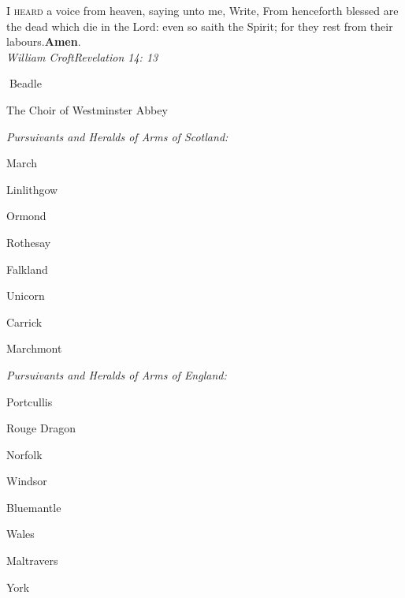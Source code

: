 \color{black}\normalfont \lettrine[lines=2,loversize=.2]{I}{ 
heard} a voice from heaven, saying unto me, Write, From henceforth blessed are
the dead which die in the Lord: even so saith the Spirit; for they rest from their
labours.\textbf{Amen}.\\\itshape\color{qred}
William Croft\hfill Revelation 14: 13

\begin{center}\normalfont\color{black}
	
Beadle

The Choir of Westminster Abbey




{\itshape\color{qred}Pursuivants and Heralds of Arms of Scotland:}

\begin{minipage}[t]{0.35\textwidth}\begin{center}
March

Linlithgow

Ormond

Rothesay\end{center}\end{minipage}\begin{minipage}[t]{0.35\textwidth}\begin{center}
Falkland 

Unicorn 

Carrick 

Marchmont	
\end{center}\end{minipage}

{\itshape\color{qred}Pursuivants and Heralds of Arms of England:}
\begin{minipage}[t]{0.35\textwidth}\begin{center}
Portcullis 

Rouge Dragon 

Norfolk

Windsor\end{center}\end{minipage}%
\begin{minipage}[t]{0.35\textwidth}\begin{center}

Bluemantle 

Wales


 Maltravers	
 
 York\end{center}
\end{minipage}


\end{center}
